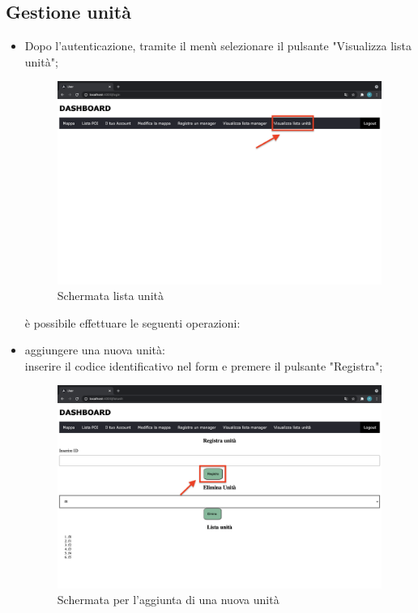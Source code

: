 \subsection{Gestione unità}
\begin{itemize}
\item Dopo l'autenticazione, tramite il menù selezionare il pulsante "Visualizza lista unità"; 
\begin{figure}[H]
    \centering
    \includegraphics[scale=0.12]{res/images/dashboard7.png}
    \caption{Schermata lista unità}
\end{figure}
è possibile effettuare le seguenti operazioni:
    \item aggiungere una nuova unità: \\inserire il codice identificativo nel form e premere il pulsante "Registra";
    \begin{figure}[H]
        \centering
        \includegraphics[scale=0.12]{res/images/nuovaunita.png}
        \caption{Schermata per l'aggiunta di una nuova unità}

\end{figure}
\end{itemize}
